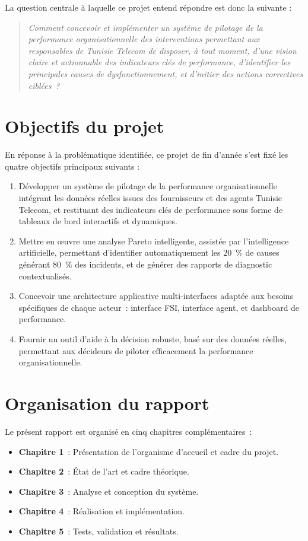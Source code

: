 \documentclass[11pt,a4paper]{report}
\begin{document}
La question centrale à laquelle ce projet entend répondre est donc la suivante :

\begin{quote}
\itshape Comment concevoir et implémenter un système de pilotage de la performance organisationnelle des interventions permettant aux responsables de Tunisie Telecom de disposer, à tout moment, d'une vision claire et actionnable des indicateurs clés de performance, d'identifier les principales causes de dysfonctionnement, et d'initier des actions correctives ciblées~?
\end{quote}

\section*{Objectifs du projet}

En réponse à la problématique identifiée, ce projet de fin d'année s'est fixé les quatre objectifs principaux suivants :

\begin{enumerate}[leftmargin=*]
  \item Développer un système de pilotage de la performance organisationnelle intégrant les données réelles issues des fournisseurs et des agents Tunisie Telecom, et restituant des indicateurs clés de performance sous forme de tableaux de bord interactifs et dynamiques.
  \item Mettre en \oe uvre une analyse Pareto intelligente, assistée par l'intelligence artificielle, permettant d'identifier automatiquement les 20~\% de causes générant 80~\% des incidents, et de générer des rapports de diagnostic contextualisés.
  \item Concevoir une architecture applicative multi-interfaces adaptée aux besoins spécifiques de chaque acteur~: interface FSI, interface agent, et dashboard de performance.
  \item Fournir un outil d'aide à la décision robuste, basé sur des données réelles, permettant aux décideurs de piloter efficacement la performance organisationnelle.
\end{enumerate}

\section*{Organisation du rapport}

Le présent rapport est organisé en cinq chapitres complémentaires~:
\begin{itemize}
  \item \textbf{Chapitre 1}~: Présentation de l'organisme d'accueil et cadre du projet.
  \item \textbf{Chapitre 2}~: État de l'art et cadre théorique.
  \item \textbf{Chapitre 3}~: Analyse et conception du système.
  \item \textbf{Chapitre 4}~: Réalisation et implémentation.
  \item \textbf{Chapitre 5}~: Tests, validation et résultats.
\end{itemize}
\end{document}
